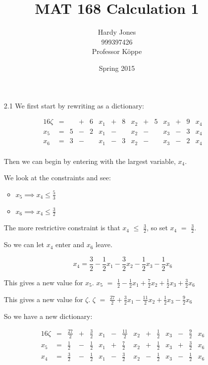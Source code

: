 \documentclass[12pt,letterpaper]{article}
\title{MAT 168 Calculation 1\vspace{-2ex}}
\author{Hardy Jones\\
        999397426\\
        Professor K\"{o}ppe\vspace{-2ex}}
\date{Spring 2015}
\newcommand*\enterleave[2]{
  So we can let #1 enter and #2 leave.
}
\newcommand*\morerestrictive[2]{
  The more restrictive constraint is that #1 $\leq$ #2, so set #1 $=$ #2.
}
\newcommand*\newdict{
  So we have a new dictionary:
}
\newcommand*\newvalue[2]{
  This gives a new value for #1. #1 $ = $ #2
}
\begin{document}
  \maketitle

  \begin{enumerate}
    \item [2.1]
      We first start by rewriting as a dictionary:

      \begin{alignat*}{16}
        \zeta & {}={} &   & {}+{} & 6 & x_1 & {}+{} & 8 & x_2 & {}+{} & 5 & x_3 & {}+{} & 9 & x_4 \\
        x_5   & {}={} & 5 & {}-{} & 2 & x_1 & {}-{} &   & x_2 & {}-{} &   & x_3 & {}-{} & 3 & x_4 \\
        x_6   & {}={} & 3 & {}-{} &   & x_1 & {}-{} & 3 & x_2 & {}-{} &   & x_3 & {}-{} & 2 & x_4 \\
      \end{alignat*}

      Then we can begin by entering with the largest variable, $x_4$.

      We look at the constraints and see:
      \begin{itemize}
        \item $x_5 \implies x_4 \leq \frac{5}{3}$
        \item $x_6 \implies x_4 \leq \frac{3}{2}$
      \end{itemize}

      \morerestrictive{$x_4$}{$\frac{3}{2}$}

      \enterleave{$x_4$}{$x_6$}

      \[
        x_4 = \frac{3}{2} - \frac{1}{2}x_1 - \frac{3}{2}x_2 - \frac{1}{2}x_3 - \frac{1}{2}x_6
      \]

      \newvalue{$x_5$}{$\frac{1}{2} - \frac{1}{2}x_1 + \frac{7}{2}x_2 + \frac{1}{2}x_3 + \frac{3}{2}x_6$}

      \newvalue{$\zeta$}{$\frac{27}{2} + \frac{3}{2}x_1 - \frac{11}{2}x_2 + \frac{1}{2}x_3 - \frac{9}{2}x_6$}

      \newdict

      \begin{alignat*}{16}
        \zeta & {}={} & \frac{27}{2} & {}+{} & \frac{3}{2} & x_1 & {}-{} & \frac{11}{2} & x_2 & {}+{} & \frac{1}{2} & x_3 & {}-{} & \frac{9}{2} & x_6 \\
        x_5   & {}={} & \frac{1}{2}  & {}-{} & \frac{1}{2} & x_1 & {}+{} & \frac{7}{2}  & x_2 & {}+{} & \frac{1}{2} & x_3 & {}+{} & \frac{3}{2} & x_6 \\
        x_4   & {}={} & \frac{3}{2}  & {}-{} & \frac{1}{2} & x_1 & {}-{} & \frac{3}{2}  & x_2 & {}-{} & \frac{1}{2} & x_3 & {}-{} & \frac{1}{2} & x_6 \\
      \end{alignat*}


\end{enumerate}
\end{document}
